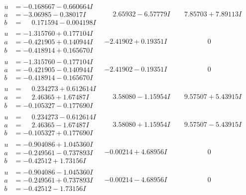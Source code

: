 \documentclass[1p]{elsarticle_modified}
\theoremstyle{definition}
\begin{document}
$$\begin{array}{c|c|c}
\begin{aligned}
u &= -0.168667 - 0.660664 I \\
a &= -3.06985 - 0.38017 I \\
b &= \phantom{-}0.171594 - 0.004198 I\end{aligned}
 & \phantom{-}2.65932 - 6.57779 I & \phantom{-}7.85703 + 7.89113 I \\ \hline\begin{aligned}
u &= -1.315760 + 0.177104 I \\
a &= -0.421905 + 0.140944 I \\
b &= -0.418914 + 0.165670 I\end{aligned}
 & -2.41902 + 0.19351 I & \phantom{-0.000000 } 0 \\ \hline\begin{aligned}
u &= -1.315760 - 0.177104 I \\
a &= -0.421905 - 0.140944 I \\
b &= -0.418914 - 0.165670 I\end{aligned}
 & -2.41902 - 0.19351 I & \phantom{-0.000000 } 0 \\ \hline\begin{aligned}
u &= \phantom{-}0.234273 + 0.612614 I \\
a &= \phantom{-}2.46365 + 1.67487 I \\
b &= -0.105327 - 0.177690 I\end{aligned}
 & \phantom{-}3.58080 - 1.15954 I & \phantom{-}9.57507 + 5.43915 I \\ \hline\begin{aligned}
u &= \phantom{-}0.234273 - 0.612614 I \\
a &= \phantom{-}2.46365 - 1.67487 I \\
b &= -0.105327 + 0.177690 I\end{aligned}
 & \phantom{-}3.58080 + 1.15954 I & \phantom{-}9.57507 - 5.43915 I \\ \hline\begin{aligned}
u &= -0.904086 + 1.045360 I \\
a &= -0.249561 - 0.737893 I \\
b &= -0.42512 + 1.73156 I\end{aligned}
 & -0.00214 + 4.68956 I & \phantom{-0.000000 } 0 \\ \hline\begin{aligned}
u &= -0.904086 - 1.045360 I \\
a &= -0.249561 + 0.737893 I \\
b &= -0.42512 - 1.73156 I\end{aligned}
 & -0.00214 - 4.68956 I & \phantom{-0.000000 } 0\\

\end{array}$$
\end{document}
